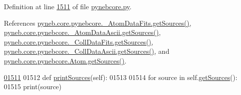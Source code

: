 Definition at line \hyperlink{pynebcore_8py_source_l01511}{1511} of file \hyperlink{pynebcore_8py_source}{pynebcore.\-py}.



References \hyperlink{pynebcore_8py_source_l00190}{pyneb.\-core.\-pynebcore.\-\_\-\-Atom\-Data\-Fits.\-get\-Sources()}, \hyperlink{pynebcore_8py_source_l00460}{pyneb.\-core.\-pynebcore.\-\_\-\-Atom\-Data\-Ascii.\-get\-Sources()}, \hyperlink{pynebcore_8py_source_l00690}{pyneb.\-core.\-pynebcore.\-\_\-\-Coll\-Data\-Fits.\-get\-Sources()}, \hyperlink{pynebcore_8py_source_l01022}{pyneb.\-core.\-pynebcore.\-\_\-\-Coll\-Data\-Ascii.\-get\-Sources()}, and \hyperlink{pynebcore_8py_source_l01516}{pyneb.\-core.\-pynebcore.\-Atom.\-get\-Sources()}.


\begin{DoxyCode}
\hypertarget{classpyneb_1_1core_1_1pynebcore_1_1_atom_l01511}{}\hyperlink{classpyneb_1_1core_1_1pynebcore_1_1_atom_a09c7f821dd9cf7ab09477fc80906e769}{01511} 
01512     \textcolor{keyword}{def }\hyperlink{classpyneb_1_1core_1_1pynebcore_1_1_atom_a09c7f821dd9cf7ab09477fc80906e769}{printSources}(self):
01513         
01514         \textcolor{keywordflow}{for} source \textcolor{keywordflow}{in} self.\hyperlink{classpyneb_1_1core_1_1pynebcore_1_1_atom_a494480eb44909d9a13ed1fb2e808b4a2}{getSources}():
01515             print(source)    
    
\end{DoxyCode}
